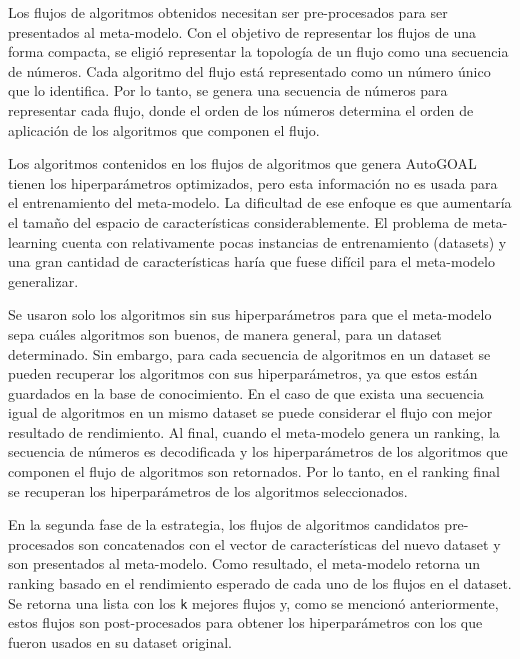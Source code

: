 Los flujos de algoritmos obtenidos necesitan ser pre-procesados para ser presentados al meta-modelo. Con el objetivo de representar los flujos de una forma compacta, se eligió representar la topología de un flujo como una secuencia de números. Cada algoritmo del flujo está representado como un número único que lo identifica. Por lo tanto, se genera una secuencia de números para representar cada flujo, donde el orden de los números determina el orden de aplicación de los algoritmos que componen el flujo.

Los algoritmos contenidos en los flujos de algoritmos que genera AutoGOAL tienen los hiperparámetros optimizados, pero esta información no es usada para el entrenamiento del meta-modelo. La dificultad de ese enfoque es que aumentaría el tamaño del espacio de características considerablemente. El problema de meta-learning cuenta con relativamente pocas instancias de entrenamiento (datasets) y una gran cantidad de características haría que fuese difícil para el meta-modelo generalizar.

Se usaron solo los algoritmos sin sus hiperparámetros para que el meta-modelo sepa cuáles algoritmos son buenos, de manera general, para un dataset determinado. Sin embargo, para cada secuencia de algoritmos en un dataset se pueden recuperar los algoritmos con sus hiperparámetros, ya que estos están guardados en la base de conocimiento. En el caso de que exista una secuencia igual de algoritmos en un mismo dataset se puede considerar el flujo con mejor resultado de rendimiento. Al final, cuando el meta-modelo genera un ranking, la secuencia de números es decodificada y los hiperparámetros de los algoritmos que componen el flujo de algoritmos son retornados. Por lo tanto, en el ranking final se recuperan los hiperparámetros de los algoritmos seleccionados.

En la segunda fase de la estrategia, los flujos de algoritmos candidatos pre-procesados son concatenados con el vector de características del nuevo dataset y son presentados al meta-modelo. Como resultado, el meta-modelo retorna un ranking basado en el rendimiento esperado de cada uno de los flujos en el dataset. Se retorna una lista con los \texttt{k} mejores flujos y, como se mencionó anteriormente, estos flujos son post-procesados para obtener los hiperparámetros con los que fueron usados en su dataset original.


